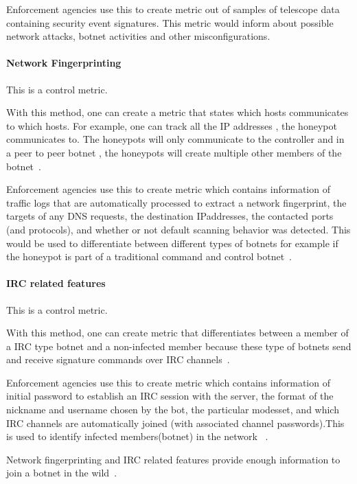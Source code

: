Enforcement agencies use this to create metric out of samples of telescope data containing security event signatures. This metric would inform about possible network attacks, botnet activities and other misconfigurations.


\paragraph{Network Fingerprinting}
This is a control metric.

With this method, one can create a metric that states which hosts communicates to which hosts. For example, one can track all the IP addresses , the honeypot communicates to. The honeypots will only communicate to the controller and in a peer to peer botnet , the honeypots will create multiple other members of the botnet~\cite{GJ2007}.

Enforcement agencies use this to create metric which contains information of traffic logs that are automatically processed to extract a network fingerprint, the targets of any DNS requests, the destination IPaddresses, the contacted ports (and protocols), and whether or not default scanning behavior was detected. This would be used to differentiate between different types of botnets for example if the honeypot is part of a traditional command and control botnet~\cite{AM2006}.


\paragraph{IRC related features}
This is a control metric.

With this method, one can create metric that differentiates between a member of a IRC type botnet and a non-infected member because these type of botnets send and receive signature commands over IRC channels~\cite{AM2006}.

Enforcement agencies use this to create metric which contains information of initial password to establish an IRC session with the server, the format of the nickname and username chosen by the bot, the particular modesset, and which IRC channels are automatically joined (with associated channel passwords).This is used to  identify infected members(botnet) in the network ~\cite{AM2006}.

Network fingerprinting and IRC related features provide enough information to join a botnet in the wild~\cite{AM2006}.

